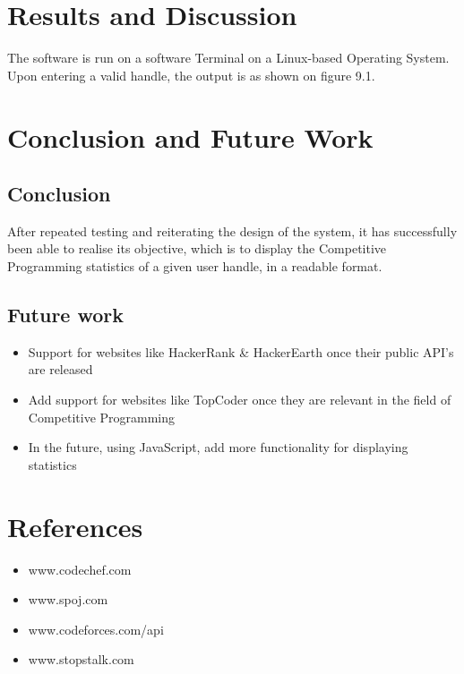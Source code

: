 \documentclass[12pt,a4paper]{report}
\begin{document}
\newpage
\chapter{Results and Discussion}
The software is run on a software Terminal on a Linux-based Operating System. Upon entering a valid handle, the output is as shown on figure 9.1.


\newpage
\chapter{Conclusion and Future Work}
\section{Conclusion}
After repeated testing and reiterating the design of the system, it has successfully been able to realise its objective, which is to display the Competitive Programming statistics of a given user handle, in a readable format.

\section{Future work}
\begin{itemize}[itemsep=0em]
	\item Support for websites like HackerRank \& HackerEarth once their public API's are released
	\item Add support for websites like TopCoder once they are relevant in the field of Competitive Programming
	\item In the future, using JavaScript, add more functionality for displaying statistics
\end{itemize}

\newpage
\chapter{References}
\begin{itemize}[itemsep=0em]
	\item www.codechef.com
	\item www.spoj.com
	\item www.codeforces.com/api
	\item www.stopstalk.com
\end{itemize}
\end{document}
